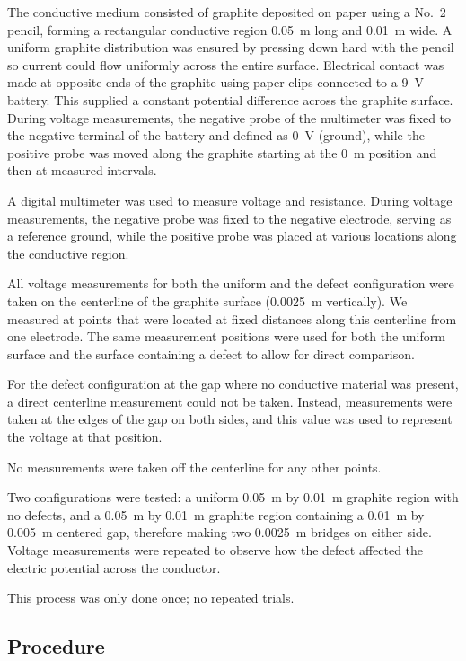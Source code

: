 \documentclass[10pt,draftcls,journal,onecolumn]{IEEEtran}
\begin{document}
The conductive medium consisted of graphite deposited on paper using a No.~2 pencil, forming a rectangular conductive region \qty{0.05}{\meter} long and \qty{0.01}{\meter} wide. A uniform graphite distribution was ensured by pressing down hard with the pencil so current could flow uniformly across the entire surface. Electrical contact was made at opposite ends of the graphite using paper clips connected to a \qty{9}{\volt} battery. This supplied a constant potential difference across the graphite surface. During voltage measurements, the negative probe of the multimeter was fixed to the negative terminal of the battery and defined as \qty{0}{\volt} (ground), while the positive probe was moved along the graphite starting at the \qty{0}{\meter} position and then at measured intervals.

A digital multimeter was used to measure voltage and resistance. During voltage measurements, the negative probe was fixed to the negative electrode, serving as a reference ground, while the positive probe was placed at various locations along the conductive region.

All voltage measurements for both the uniform and the defect configuration were taken on the centerline of the graphite surface (\qty{0.0025}{\meter} vertically). We measured at points that were located at fixed distances along this centerline from one electrode. The same measurement positions were used for both the uniform surface and the surface containing a defect to allow for direct comparison.

For the defect configuration at the gap where no conductive material was present, a direct centerline measurement could not be taken. Instead, measurements were taken at the edges of the gap on both sides, and this value was used to represent the voltage at that position.

No measurements were taken off the centerline for any other points.

Two configurations were tested: a uniform \qty{0.05}{\meter} by \qty{0.01}{\meter} graphite region with no defects, and a \qty{0.05}{\meter} by \qty{0.01}{\meter} graphite region containing a \qty{0.01}{\meter} by \qty{0.005}{\meter} centered gap, therefore making two \qty{0.0025}{\meter} bridges on either side. Voltage measurements were repeated to observe how the defect affected the electric potential across the conductor.

This process was only done once; no repeated trials.

\subsection{Procedure}
\end{document}
